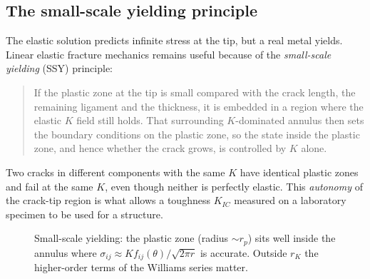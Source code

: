 \documentclass[11pt,a4paper]{article}
\begin{document}
\subsection{The small-scale yielding principle}
The elastic solution predicts infinite stress at the tip, but a real metal yields. Linear elastic
fracture mechanics remains useful because of the \emph{small-scale yielding} (SSY) principle:

\begin{quote}
If the plastic zone at the tip is small compared with the crack length, the remaining ligament and
the thickness, it is embedded in a region where the elastic $K$ field still holds. That surrounding
$K$-dominated annulus then sets the boundary conditions on the plastic zone, so the state inside the
plastic zone, and hence whether the crack grows, is controlled by $K$ alone.
\end{quote}

Two cracks in different components with the same $K$ have identical plastic zones and fail at the same
$K$, even though neither is perfectly elastic. This \emph{autonomy} of the crack-tip region is what
allows a toughness $K_{IC}$ measured on a laboratory specimen to be used for a structure.

\begin{figure}[!htbp]
\centering
{}
\caption{Small-scale yielding: the plastic zone (radius $\sim r_p$) sits well inside the annulus where
$\sigma_{ij}\approx K f_{ij}(\theta)/\sqrt{2\pi r}$ is accurate. Outside $r_K$ the higher-order terms
of the Williams series matter.}
\label{fig:ssy}
\end{figure}
\end{document}
